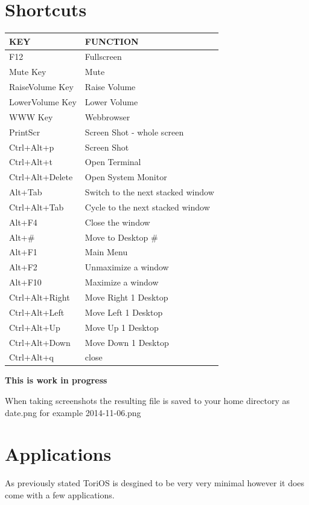 \documentclass[12pt,a4paper]{book}
\begin{document}
\chapter{Shortcuts}
\begin{center}\begin{tabular}{|l|l|}
\hline \textbf{KEY} & \textbf{FUNCTION} \\
\hline F12 & Fullscreen \\
\hline Mute Key & Mute \\
\hline RaiseVolume Key & Raise Volume \\
\hline LowerVolume Key & Lower Volume \\
\hline WWW Key & Webbrowser \\
\hline PrintScr & Screen Shot - whole screen \\
\hline Ctrl+Alt+p &	Screen Shot \\
\hline Ctrl+Alt+t &	 Open Terminal \\
\hline Ctrl+Alt+Delete & Open System Monitor \\
\hline Alt+Tab & Switch to the next stacked window \\
\hline Ctrl+Alt+Tab & Cycle to the next stacked window \\
\hline Alt+F4 &	Close the window \\
\hline Alt+\# & Move to Desktop \# \\
\hline Alt+F1 &	Main Menu \\
\hline Alt+F2 & Unmaximize a window \\
\hline Alt+F10 & Maximize a window \\
\hline Ctrl+Alt+Right & Move Right 1 Desktop \\
\hline Ctrl+Alt+Left & Move Left 1 Desktop \\
\hline Ctrl+Alt+Up & Move Up 1 Desktop \\
\hline Ctrl+Alt+Down & Move Down 1 Desktop \\
\hline Ctrl+Alt+q &	close \\
\hline \end{tabular}
\end{center}

\textbf{This is work in progress}

When taking screenshots the resulting file is saved to your home directory as date.png for example 2014-11-06.png

\chapter{Applications}
As previously stated ToriOS is desgined to be very very minimal however it does come with a few applications. 
\end{document}
